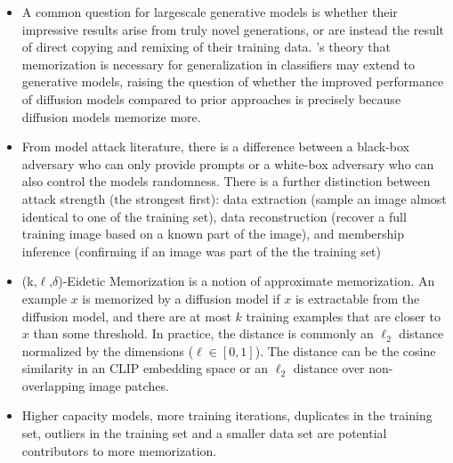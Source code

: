 \documentclass{article}
\begin{document}
\begin{itemize}
    \item A common question for largescale generative models is whether their impressive results arise from truly novel generations, or are instead the result of direct copying and remixing of their training data. \cite{feldman2020does}'s theory that memorization is necessary for generalization in classifiers may extend to generative models, raising the question of whether the improved performance of diffusion models compared to prior approaches is precisely because diffusion models memorize more. 
    \item From model attack literature, there is a difference between a black-box adversary who can only provide prompts or a white-box adversary who can also control the models randomness. There is a further distinction between attack strength (the strongest first): data extraction (sample an image almost identical to one of the training set), data reconstruction (recover a full training image based on a known part of the image), and membership inference (confirming if an image was part of the the training set)
    \item (k,$\ell$,$\delta$)-Eidetic Memorization is a notion of approximate memorization. An example $x$ is memorized by a diffusion model if $x$ is extractable from the diffusion model, and there are at most $k$ training examples that are closer to $x$ than some threshold. In practice, the distance is commonly an $\ell_2$ distance normalized by the dimensions ($\ell \in [0,1]$). The distance can be the cosine similarity in an CLIP embedding space or an $\ell_2$ distance over non-overlapping image patches.
    \item Higher capacity models, more training iterations, duplicates in the training set, outliers in the training set and a smaller data set are potential contributors to more memorization. 

\end{itemize}
\end{document}
